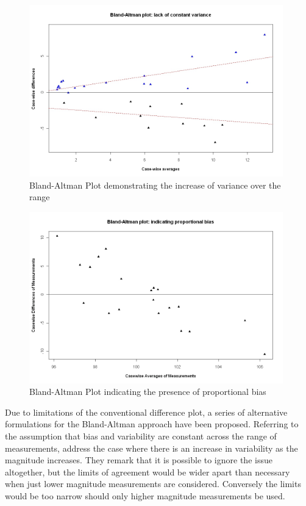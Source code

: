 \documentclass[12pt, a4paper]{report}
\theoremstyle{plain}
\theoremstyle{definition}
\theoremstyle{remark}
\begin{document}
	\begin{figure}[h!]
		\begin{center}
			\includegraphics[width=110mm]{images/BAFanEffect.jpeg}
			\caption{Bland-Altman Plot demonstrating the increase of variance over the range}\label{BAFanEffect}
		\end{center}
	\end{figure}
	
\begin{figure}[h!]
\begin{center}
\includegraphics[width=110mm]{images/PropBias.jpeg}
\caption{Bland-Altman Plot indicating the presence of proportional bias}\label{PropBias}
\end{center}
\end{figure}
Due to limitations of the conventional difference plot, a series of alternative formulations for the Bland-Altman approach have been proposed. Referring to the assumption that bias and variability are constant across the range of measurements, \citet{BA99} address the case where there is an increase in variability as the magnitude increases. They remark that it is possible to ignore the issue altogether, but the limits of agreement would be wider apart than necessary when just lower magnitude measurements are considered. Conversely the limits would be too narrow should only higher magnitude measurements be used. 
	
\end{document}
